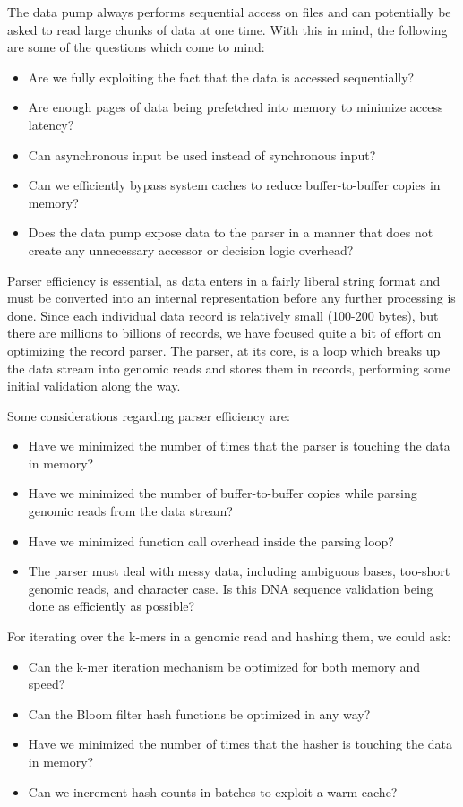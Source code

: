 \documentclass{article}
\begin{document}
The data pump always performs sequential access on files and can potentially be
asked to read large chunks of data at one time. With this in mind, the
following are some of the questions which come to mind:
\begin{itemize}
\item Are we fully exploiting the fact that the data is accessed sequentially?
\item Are enough pages of data being prefetched into memory to minimize access
latency?
\item Can asynchronous input be used instead of synchronous input?
\item Can we efficiently bypass system caches to reduce buffer-to-buffer copies
in memory?
\item Does the data pump expose data to the parser in a manner that
does not create any unnecessary accessor or decision logic overhead?
\end{itemize}

Parser efficiency is essential, as data enters in a fairly liberal
string format and must be converted into an internal representation before
any further processing is done.  Since each individual data record is
relatively small (100-200 bytes), but there are millions to billions of
records, we have focused quite a bit of effort on optimizing the
record parser. The parser, at its core, is a loop which breaks up the 
data stream into genomic reads and stores them in records, performing some 
initial validation along the way.

Some considerations regarding parser efficiency are:
\begin{itemize}
\item Have we minimized the number of times that the parser is touching the 
data in memory?
\item Have we minimized the number of buffer-to-buffer copies while parsing 
genomic reads from the data stream?
\item Have we minimized function call overhead inside the parsing loop?
\item The parser must deal with messy data, including ambiguous bases,
too-short genomic reads, and character case.  Is this DNA sequence validation being done as efficiently as possible?
\end{itemize}

For iterating over the k-mers in a genomic read and hashing them, we could ask:
\begin{itemize}
\item Can the k-mer iteration mechanism be optimized for both memory and speed?
\item Can the Bloom filter hash functions be optimized in any way?
\item Have we minimized the number of times that the hasher is touching the 
data in memory?
\item Can we increment hash counts in batches to exploit a warm cache?
\end{itemize}
\end{document}
